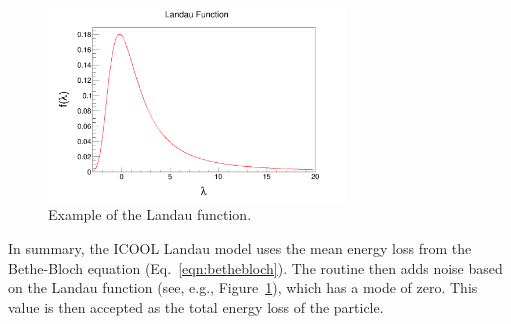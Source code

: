 \begin{figure}[h!]
  \centering
    \includegraphics[width=0.7\textwidth]{"Figures/landau example"} 
  \caption[Example of the Landau function.]{Example of the Landau function.}
  \label{fig:landau_example}
\end{figure}

In summary, the ICOOL Landau model uses the mean energy loss from the Bethe-Bloch equation (Eq.~\eqref{eqn:bethebloch}). The routine then adds noise based on the Landau function (see, e.g., Figure~\ref{fig:landau_example}), which has a mode of zero. This value is then accepted as the total energy loss of the particle.


